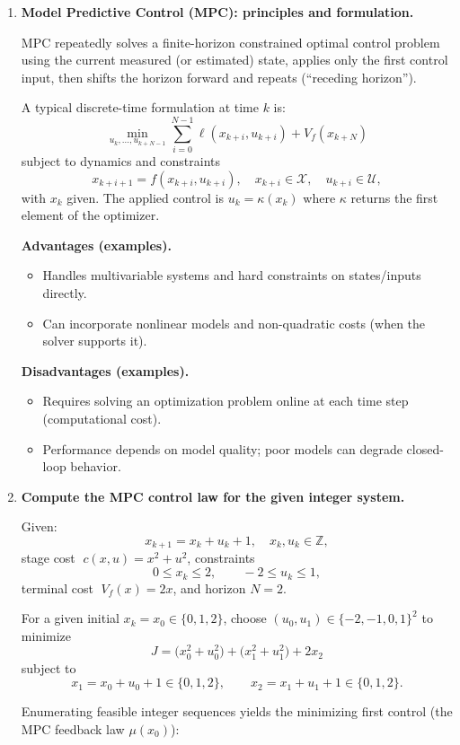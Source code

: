\documentclass[11pt]{article}
\begin{document}
\begin{enumerate}[label=(\alph*)]

\item \textbf{Model Predictive Control (MPC): principles and formulation.}

MPC repeatedly solves a finite-horizon constrained optimal control problem using the current measured (or estimated) state, applies only the first control input, then shifts the horizon forward and repeats (``receding horizon'').

A typical discrete-time formulation at time $k$ is:
\[
\min_{u_k,\ldots,u_{k+N-1}} \sum_{i=0}^{N-1} \ell(x_{k+i},u_{k+i}) + V_f(x_{k+N})
\]
subject to dynamics and constraints
\[
x_{k+i+1}=f(x_{k+i},u_{k+i}),\quad x_{k+i}\in \mathcal{X},\quad u_{k+i}\in \mathcal{U},
\]
with $x_k$ given. The applied control is $u_k=\kappa(x_k)$ where $\kappa$ returns the first element of the optimizer.

\textbf{Advantages (examples).}
\begin{itemize}
  \item Handles multivariable systems and hard constraints on states/inputs directly.
  \item Can incorporate nonlinear models and non-quadratic costs (when the solver supports it).
\end{itemize}

\textbf{Disadvantages (examples).}
\begin{itemize}
  \item Requires solving an optimization problem online at each time step (computational cost).
  \item Performance depends on model quality; poor models can degrade closed-loop behavior.
\end{itemize}

\item \textbf{Compute the MPC control law for the given integer system.}

Given:
\[
x_{k+1} = x_k + u_k + 1,\quad x_k,u_k \in \mathbb{Z},
\]
stage cost $\;c(x,u)=x^2+u^2$, constraints
\[
0\le x_k \le 2,\qquad -2\le u_k \le 1,
\]
terminal cost $\;V_f(x)=2x$, and horizon $N=2$.

For a given initial $x_k=x_0\in\{0,1,2\}$, choose $(u_0,u_1)\in\{-2,-1,0,1\}^2$ to minimize
\[
J = \bigl(x_0^2+u_0^2\bigr)+\bigl(x_1^2+u_1^2\bigr)+2x_2
\]
subject to
\[
x_1=x_0+u_0+1\in\{0,1,2\},\qquad x_2=x_1+u_1+1\in\{0,1,2\}.
\]

Enumerating feasible integer sequences yields the minimizing first control (the MPC feedback law $\mu(x_0)$):


\end{enumerate}
\end{document}
